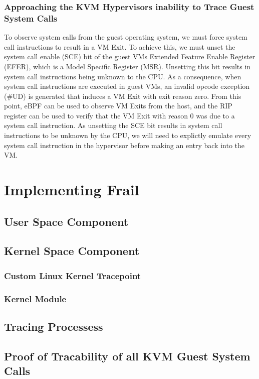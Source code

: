 \documentclass{report}
\begin{document}
\begin{spacing}{1.5}
\subsection{Approaching the KVM Hypervisors inability to Trace Guest System Calls}

{\large
To observe system calls from the guest operating system, we must force system call instructions to result in a VM Exit. To achieve this, we must unset the system call enable (SCE) bit of the guest VMs Extended Feature Enable Register (EFER), which is a Model Specific Register (MSR). Unsetting this bit results in system call instructions being unknown to the CPU. As a consequence, when system call instructions are executed in guest VMs, an invalid opcode exception (\#UD) is generated that induces a VM Exit with exit reason zero. From this point, eBPF can be used to observe VM Exits from the host, and the RIP register can be used to verify that the VM Exit with reason 0 was due to a system call instruction. As unsetting the SCE bit results in system call instructions to be unknown by the CPU, we will need to explictly emulate every system call instruction in the hypervisor before making an entry back into the VM.
\newline
}

\chapter{Implementing Frail}

\section{User Space Component}
\section{Kernel Space Component}
\subsection{Custom Linux Kernel Tracepoint}
\subsection{Kernel Module}
\section{Tracing Processess}
\section{Proof of Tracability of all KVM Guest System Calls}


\end{spacing}
\end{document}
